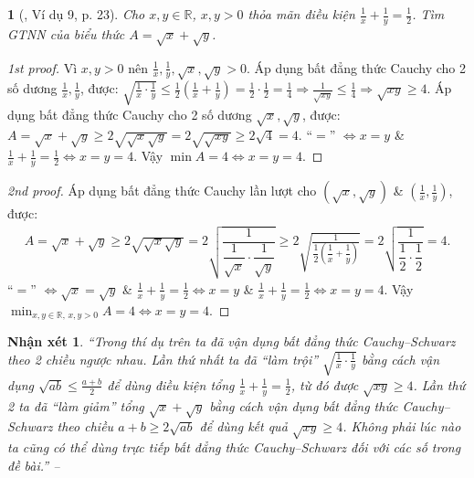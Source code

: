 \documentclass{article}
\newtheorem{baitoan}{}
\newtheorem{nhanxet}{Nhận xét}
\begin{document}
\begin{baitoan}[\cite{Tuyen_Toan_9_old}, Ví dụ 9, p. 23]
	Cho $x,y\in\mathbb{R}$, $x,y > 0$ thỏa mãn điều kiện $\frac{1}{x} + \frac{1}{y} = \frac{1}{2}$. Tìm {\rm GTNN} của biểu thức $A = \sqrt{x} + \sqrt{y}$.
\end{baitoan}

\begin{proof}[1st proof]
	Vì $x,y > 0$ nên $\frac{1}{x},\frac{1}{y},\sqrt{x},\sqrt{y} > 0$. Áp dụng bất đẳng thức Cauchy cho 2 số dương $\frac{1}{x},\frac{1}{y}$, được: $\sqrt{\frac{1}{x}\cdot\frac{1}{y}}\le\frac{1}{2}\left(\frac{1}{x} + \frac{1}{y}\right) = \frac{1}{2}\cdot\frac{1}{2} = \frac{1}{4}\Rightarrow\frac{1}{\sqrt{xy}}\le\frac{1}{4}\Rightarrow\sqrt{xy}\ge4$. Áp dụng bất đẳng thức Cauchy cho 2 số dương $\sqrt{x},\sqrt{y}$, được: $A = \sqrt{x} + \sqrt{y}\ge2\sqrt{\sqrt{x}\sqrt{y}} = 2\sqrt{\sqrt{xy}}\ge2\sqrt{4} = 4$. ``$=$'' $\Leftrightarrow x = y$ \& $\frac{1}{x} + \frac{1}{y} = \frac{1}{2}\Leftrightarrow x = y = 4$. Vậy $\min A = 4\Leftrightarrow x = y = 4$.
\end{proof}

\begin{proof}[2nd proof]
	Áp dụng bất đẳng thức Cauchy lần lượt cho $(\sqrt{x},\sqrt{y})$ \& $\left(\frac{1}{x},\frac{1}{y}\right)$, được:
	\begin{align*}
		A = \sqrt{x} + \sqrt{y}\ge2\sqrt{\sqrt{x}\sqrt{y}} = 2\sqrt{\dfrac{1}{\dfrac{1}{\sqrt{x}}\cdot\dfrac{1}{\sqrt{y}}}}\ge2\sqrt{\frac{1}{\dfrac{1}{2}\left(\dfrac{1}{x} + \dfrac{1}{y}\right)}} = 2\sqrt{\dfrac{1}{\dfrac{1}{2}\cdot\dfrac{1}{2}}} = 4.
	\end{align*}
	``$=$'' $\Leftrightarrow \sqrt{x} = \sqrt{y}$ \& $\frac{1}{x} + \frac{1}{y} = \frac{1}{2}\Leftrightarrow x = y$ \& $\frac{1}{x} + \frac{1}{y} = \frac{1}{2}\Leftrightarrow x = y = 4$. Vậy $\min_{x,y\in\mathbb{R},\,x,y > 0} A = 4\Leftrightarrow x = y = 4$.
\end{proof}

\begin{nhanxet}
	``Trong thí dụ trên ta đã vận dụng bất đẳng thức Cauchy--Schwarz theo 2 chiều ngược nhau. Lần thứ nhất ta đã ``làm trội'' $\sqrt{\frac{1}{x}\cdot\frac{1}{y}}$ bằng cách vận dụng $\sqrt{ab}\le\frac{a + b}{2}$ để dùng điều kiện tổng $\frac{1}{x} + \frac{1}{y} = \frac{1}{2}$, từ đó được $\sqrt{xy}\ge4$. Lần thứ 2 ta đã ``làm giảm'' tổng $\sqrt{x} + \sqrt{y}$ bằng cách vận dụng bất đẳng thức Cauchy--Schwarz theo chiều $a + b\ge2\sqrt{ab}$ để dùng kết quả $\sqrt{xy}\ge4$. Không phải lúc nào ta cũng có thể dùng trực tiếp bất đẳng thức Cauchy--Schwarz đối với các số trong đề bài.'' -- \emph{\cite[p. 24]{Tuyen_Toan_9_old}}
\end{nhanxet}
\end{document}
